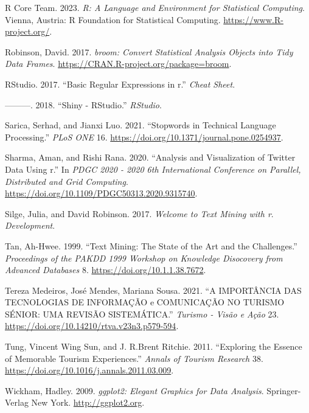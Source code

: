 \documentclass[preprint, 3p,
authoryear]{elsarticle} %
\newlength{\cslhangindent}
\newlength{\cslentryspacingunit} %
\newenvironment{CSLReferences}[2] %
 {%
  \setlength{\parindent}{0pt}
  \ifodd #1
  \let\oldpar\par
  \def\par{\hangindent=\cslhangindent\oldpar}
  \fi
  \setlength{\parskip}{#2\cslentryspacingunit}
 }%
 {}
\begin{document}
\begin{CSLReferences}{1}{0}
\leavevmode{}%
R Core Team. 2023. \emph{R: A Language and Environment for Statistical
Computing}. Vienna, Austria: R Foundation for Statistical Computing.
\url{https://www.R-project.org/}.

\leavevmode{}%
Robinson, David. 2017. \emph{{broom}: Convert Statistical Analysis
Objects into Tidy Data Frames}.
\url{https://CRAN.R-project.org/package=broom}.

\leavevmode{}%
RStudio. 2017. {``Basic Regular Expressions in r.''} \emph{Cheat Sheet}.

\leavevmode{}%
---------. 2018. {``Shiny - RStudio.''} \emph{RStudio}.

\leavevmode{}%
Sarica, Serhad, and Jianxi Luo. 2021. {``Stopwords in Technical Language
Processing.''} \emph{PLoS ONE} 16.
\url{https://doi.org/10.1371/journal.pone.0254937}.

\leavevmode{}%
Sharma, Aman, and Rishi Rana. 2020. {``Analysis and Visualization of
Twitter Data Using r.''} In \emph{PDGC 2020 - 2020 6th International
Conference on Parallel, Distributed and Grid Computing}.
\url{https://doi.org/10.1109/PDGC50313.2020.9315740}.

\leavevmode{}%
Silge, Julia, and David Robinson. 2017. \emph{Welcome to Text Mining
with r}. \emph{Development}.

\leavevmode{}%
Tan, Ah-Hwee. 1999. {``Text Mining: The State of the Art and the
Challenges.''} \emph{Proceedings of the PAKDD 1999 Workshop on Knowledge
Disocovery from Advanced Databases} 8.
\url{https://doi.org/10.1.1.38.7672}.

\leavevmode{}%
Tereza Medeiros, José Mendes, Mariana Sousa. 2021. {``A IMPORTÂNCIA DAS
TECNOLOGIAS DE INFORMAÇÃO e COMUNICAÇÃO NO TURISMO SÉNIOR: UMA REVISÃO
SISTEMÁTICA.''} \emph{Turismo - Visão e Ação} 23.
\url{https://doi.org/10.14210/rtva.v23n3.p579-594}.

\leavevmode{}%
Tung, Vincent Wing Sun, and J. R.Brent Ritchie. 2011. {``Exploring the
Essence of Memorable Tourism Experiences.''} \emph{Annals of Tourism
Research} 38. \url{https://doi.org/10.1016/j.annals.2011.03.009}.

\leavevmode{}%
Wickham, Hadley. 2009. \emph{{ggplot2}: Elegant Graphics for Data
Analysis}. Springer-Verlag New York. \url{http://ggplot2.org}.


\end{CSLReferences}
\end{document}
